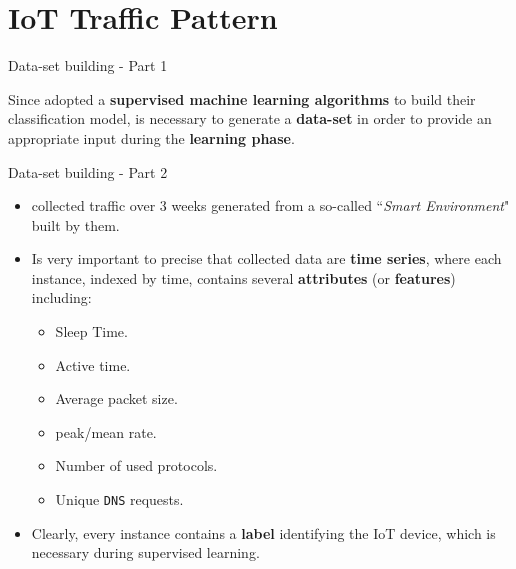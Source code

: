 \documentclass[10pt]{beamer}
\begin{document}
\section{IoT Traffic Pattern}
\begin{frame}{Data-set building - Part 1}

\begin{block}{}
\justifying
Since \citet{ITPAReport} adopted a \textbf{supervised machine learning algorithms} to build their classification model, is necessary to generate a \textbf{data-set} in order to provide an appropriate input during the \textbf{learning phase}.
\end{block}

\end{frame} 
\begin{frame}{Data-set building - Part 2}

\begin{itemize}
\justifying
\item \citet{ITPAReport} collected traffic over $3$ weeks generated from a so-called ``\textit{Smart Environment}" built by them. 

\item Is very important to precise that collected data are \textbf{time series}, where each instance, indexed by time, contains several \textbf{attributes} (or \textbf{features}) including:

\begin{itemize}
\item Sleep Time.
\item Active time.
\item Average packet size.
\item peak/mean rate.
\item Number of used protocols.
\item Unique \texttt{DNS} requests. 

\end{itemize}

\item Clearly, every instance contains a \textbf{label} identifying the IoT device, which is necessary during supervised learning.
\end{itemize}


\end{frame} 
\end{document}

